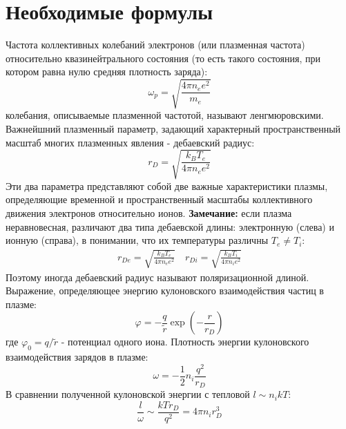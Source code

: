 \documentclass[a4paper, 12pt]{article}
\begin{document}
\section*{Необходимые формулы}
Частота коллективных колебаний электронов (или плазменная частота) относительно квазинейтрального состояния (то есть такого состояния, при котором равна нулю средняя
плотность заряда):
\begin{equation}
    \omega_{p} = \sqrt{\frac{4\pi n_{e}e^{2}}{m_{e}}}
    \label{частота коллективных колебаний}
\end{equation}
колебания, описываемые плазменной частотой, называют ленгмюровскими.\newline
Важнейшний плазменный параметр, задающий характерный пространственный масштаб многих плазменных явления - дебаевский радиус:
\begin{equation}
    r_{D} = \sqrt{\frac{k_{B}T_{e}}{4\pi n_{e}e^{2}}}
    \label{дебаевский радиус основной}
\end{equation}
Эти два  параметра представляют собой две важные характеристики плазмы, определяющие временной и пространственный масштабы коллективного
движения электронов относительно ионов.\newline 
\textbf{Замечание:} если плазма неравновесная, различают два типа дебаевской длины: электронную (слева) и ионную (справа),
в понимании, что их температуры различны $T_{e} \neq T_{i}$:
\begin{align}
    r_{De} = \sqrt{\frac{k_{B}T_{e}}{4\pi n_{e}e^{2}}} \quad r_{Di} = \sqrt{\frac{k_{B}T_{i}}{4\pi n_{i}e^{2}}}
\end{align}
Поэтому иногда дебаевский радиус называют поляризационной длиной.\newline
Выражение, определяющее энергию кулоновского взаимодействия частиц в плазме:
\begin{equation}
    \varphi = -\frac{q}{\tilde{r}}\exp\left(-\frac{r}{r_{D}}\right)
    \label{энергия кулоновского взаимодействия}
\end{equation}
где $\varphi_{0} = q/\tilde{r}$ - потенциал одного иона.\newline
Плотность энергии кулоновского взаимодействия зарядов в плазме:
\begin{equation}
    \omega = -\frac{1}{2}n_{i}\frac{q^2}{r_{D}}
    \label{плотность энергии кулоновского взаимодействия}
\end{equation}
В сравнении полученной кулоновской энергии с тепловой $l \sim n_{i}kT$:
\begin{equation}
    \frac{l}{\omega} \sim \frac{kTr_{D}}{q^2} = 4\pi n_{i}r^3_{D}
    \label{отношение энергий}
\end{equation}
\end{document}
